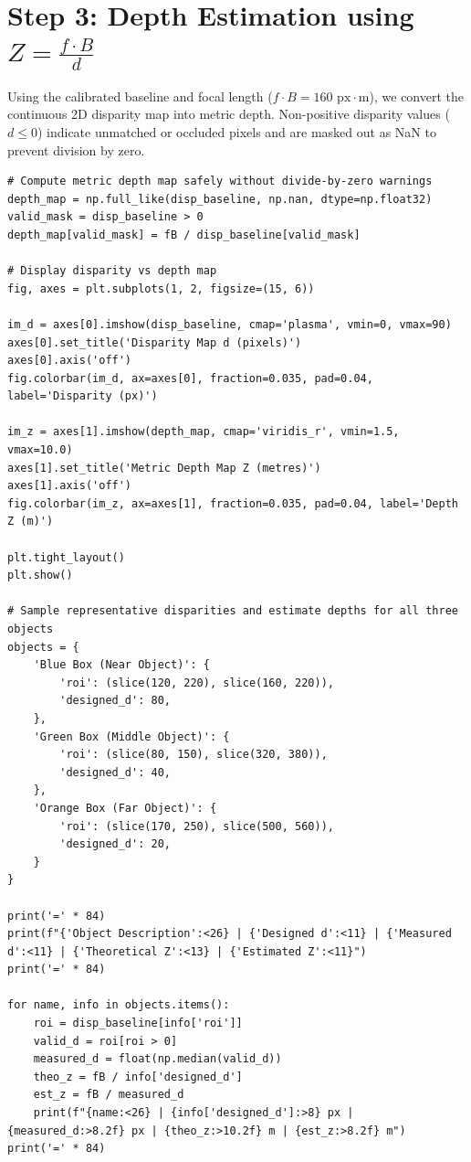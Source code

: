 \documentclass[12pt]{article}
\begin{document}
\section{Step 3: Depth Estimation using $Z = \frac{f \cdot B}{d}$}

Using the calibrated baseline and focal length ($f \cdot B = 160\text{ px}\cdot\text{m}$), we convert the continuous 2D disparity map into metric depth. Non-positive disparity values ($d \le 0$) indicate unmatched or occluded pixels and are masked out as NaN to prevent division by zero.

\begin{lstlisting}[style=code, caption={Metric Depth Computation and Object Depth Sampling}]
# Compute metric depth map safely without divide-by-zero warnings
depth_map = np.full_like(disp_baseline, np.nan, dtype=np.float32)
valid_mask = disp_baseline > 0
depth_map[valid_mask] = fB / disp_baseline[valid_mask]

# Display disparity vs depth map
fig, axes = plt.subplots(1, 2, figsize=(15, 6))

im_d = axes[0].imshow(disp_baseline, cmap='plasma', vmin=0, vmax=90)
axes[0].set_title('Disparity Map d (pixels)')
axes[0].axis('off')
fig.colorbar(im_d, ax=axes[0], fraction=0.035, pad=0.04, label='Disparity (px)')

im_z = axes[1].imshow(depth_map, cmap='viridis_r', vmin=1.5, vmax=10.0)
axes[1].set_title('Metric Depth Map Z (metres)')
axes[1].axis('off')
fig.colorbar(im_z, ax=axes[1], fraction=0.035, pad=0.04, label='Depth Z (m)')

plt.tight_layout()
plt.show()

# Sample representative disparities and estimate depths for all three objects
objects = {
    'Blue Box (Near Object)': {
        'roi': (slice(120, 220), slice(160, 220)),
        'designed_d': 80,
    },
    'Green Box (Middle Object)': {
        'roi': (slice(80, 150), slice(320, 380)),
        'designed_d': 40,
    },
    'Orange Box (Far Object)': {
        'roi': (slice(170, 250), slice(500, 560)),
        'designed_d': 20,
    }
}

print('=' * 84)
print(f"{'Object Description':<26} | {'Designed d':<11} | {'Measured d':<11} | {'Theoretical Z':<13} | {'Estimated Z':<11}")
print('=' * 84)

for name, info in objects.items():
    roi = disp_baseline[info['roi']]
    valid_d = roi[roi > 0]
    measured_d = float(np.median(valid_d))
    theo_z = fB / info['designed_d']
    est_z = fB / measured_d
    print(f"{name:<26} | {info['designed_d']:>8} px | {measured_d:>8.2f} px | {theo_z:>10.2f} m | {est_z:>8.2f} m")
print('=' * 84)
\end{lstlisting}
\end{document}
